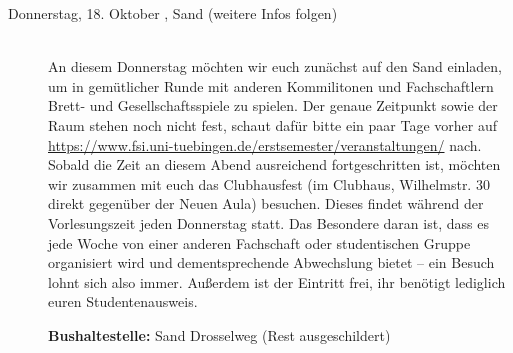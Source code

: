 \begin{description}
\item[Donnerstag, 18. Oktober \Jahr,  Sand (weitere Infos folgen)]\ \\
An diesem Donnerstag möchten wir euch zunächst auf den Sand einladen, um in gemütlicher Runde mit anderen Kommilitonen und Fachschaftlern Brett- und Gesellschaftsspiele zu spielen. Der genaue Zeitpunkt sowie der Raum stehen noch nicht fest, schaut dafür bitte ein paar Tage vorher auf \url{https://www.fsi.uni-tuebingen.de/erstsemester/veranstaltungen/} nach.\\ Sobald die Zeit an diesem Abend ausreichend fortgeschritten ist, möchten wir zusammen mit euch das Clubhausfest (im Clubhaus, Wilhelmstr. 30 direkt gegenüber der Neuen Aula) besuchen. Dieses findet während der Vorlesungszeit jeden Donnerstag statt. Das Besondere daran ist, dass es jede Woche von einer anderen Fachschaft oder studentischen Gruppe organisiert wird und dementsprechende Abwechslung bietet -- ein Besuch lohnt sich also immer. Außerdem ist der Eintritt frei, ihr benötigt lediglich euren Studentenausweis.

\textbf{Bushaltestelle:} Sand Drosselweg (Rest ausgeschildert)

 
 
\end{description}
